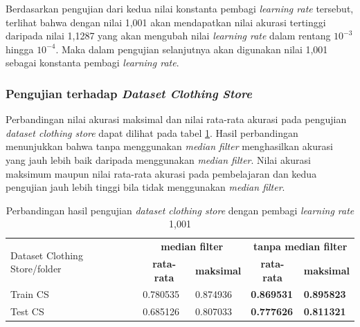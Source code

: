 \noindent Berdasarkan pengujian dari kedua nilai konstanta pembagi \textit{learning rate} tersebut, terlihat bahwa dengan nilai 1,001 akan mendapatkan nilai akurasi tertinggi daripada nilai 1,1287 yang akan mengubah nilai \textit{learning rate} dalam rentang $10^{-3}$ hingga $10^{-4}$. Maka dalam pengujian selanjutnya akan digunakan nilai 1,001 sebagai konstanta pembagi \textit{learning rate}.

\subsubsection{Pengujian terhadap \textit{Dataset Clothing Store}}
\noindent Perbandingan nilai akurasi maksimal dan nilai rata-rata akurasi pada pengujian \textit{dataset clothing store} dapat dilihat pada tabel \ref{tbl:ComparisonCS}. Hasil perbandingan menunjukkan bahwa tanpa menggunakan \textit{median filter} menghasilkan akurasi yang jauh lebih baik daripada menggunakan \textit{median filter}. Nilai akurasi maksimum maupun nilai rata-rata akurasi pada pembelajaran dan kedua pengujian jauh lebih tinggi bila tidak menggunakan \textit{median filter}.
\begin{table}[H]
\centering
\begin{small}
\caption{Perbandingan hasil pengujian \textit{dataset clothing store} dengan pembagi \textit{learning rate} 1,001}
\label{tbl:ComparisonCS}
\begin{tabular}{|l|l|l|l|l|}
\hline
\multirow{2}{*}{Dataset Clothing Store/folder}                                         & \multicolumn{2}{c|}{\textbf{median filter}}                                      & \multicolumn{2}{c|}{\textbf{tanpa median filter}}                                \\ \cline{2-5} 
                                        & \multicolumn{1}{c|}{\textbf{rata-rata}} & \multicolumn{1}{c|}{\textbf{maksimal}} & \multicolumn{1}{c|}{\textbf{rata-rata}} & \multicolumn{1}{c|}{\textbf{maksimal}} \\ \hline
\multicolumn{1}{|l|}{Train CS} & 0.780535                                & 0.874936                               & \textbf{0.869531}                       & \textbf{0.895823}                      \\ \hline
\multicolumn{1}{|l|}{Test CS}  & 0.685126                                & 0.807033                               & \textbf{0.777626}                       & \textbf{0.811321}                      \\ \hline
\end{tabular}
\end{small}
\end{table}

